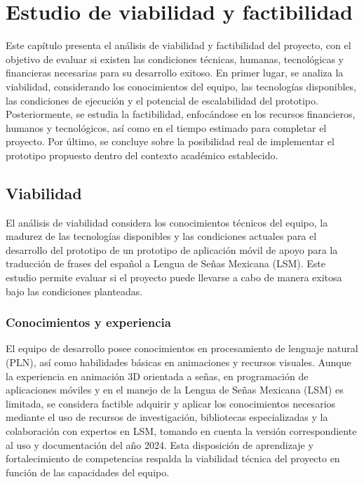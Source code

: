 \chapter{Estudio de viabilidad y factibilidad}

Este capítulo presenta el análisis de viabilidad y factibilidad del proyecto, con el objetivo de evaluar si existen las condiciones técnicas, humanas, tecnológicas y financieras necesarias para su desarrollo exitoso. En primer lugar, se analiza la viabilidad, considerando los conocimientos del equipo, las tecnologías disponibles, las condiciones de ejecución y el potencial de escalabilidad del prototipo. Posteriormente, se estudia la factibilidad, enfocándose en los recursos financieros, humanos y tecnológicos, así como en el tiempo estimado para completar el proyecto. Por último, se concluye sobre la posibilidad real de implementar el prototipo propuesto dentro del contexto académico establecido.\\

\section{Viabilidad}
El análisis de viabilidad considera los conocimientos técnicos del equipo, la madurez de las tecnologías disponibles y las condiciones actuales para el desarrollo del prototipo de un prototipo de aplicación móvil de apoyo para la traducción de frases del español a Lengua de Señas Mexicana (LSM). Este estudio permite evaluar si el proyecto puede llevarse a cabo de manera exitosa bajo las condiciones planteadas.

\subsection{Conocimientos y experiencia}
El equipo de desarrollo posee conocimientos en procesamiento de lenguaje natural (PLN), así como habilidades básicas en animaciones y recursos visuales. Aunque la experiencia en animación 3D orientada a señas, en programación de aplicaciones móviles y en el manejo de la Lengua de Señas Mexicana (LSM) es limitada, se considera factible adquirir y aplicar los conocimientos necesarios mediante el uso de recursos de investigación, bibliotecas especializadas y la colaboración con expertos en LSM, tomando en cuenta la versión correspondiente al uso y documentación del año 2024. Esta disposición de aprendizaje y fortalecimiento de competencias respalda la viabilidad técnica del proyecto en función de las capacidades del equipo.

